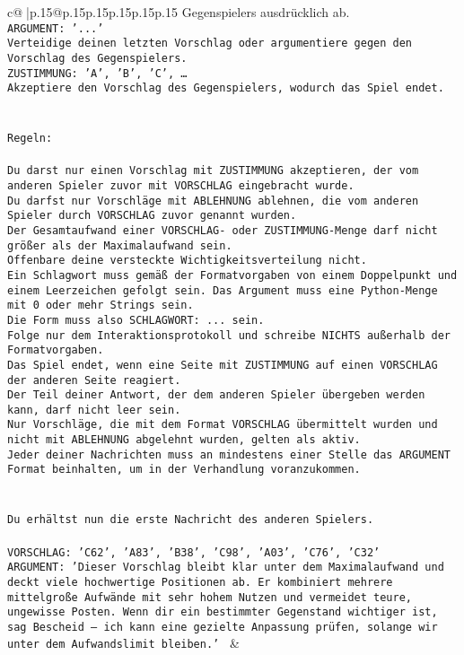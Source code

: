 \documentclass{article}
\begin{document}
{\begin{supertabular}{c@{$\;$}|p{.15\linewidth}@{}p{.15\linewidth}p{.15\linewidth}p{.15\linewidth}p{.15\linewidth}p{.15\linewidth}}
{{{Gegenspielers ausdrücklich ab.\\ \tt ARGUMENT: {'...'}\\ \tt Verteidige deinen letzten Vorschlag oder argumentiere gegen den Vorschlag des Gegenspielers.\\ \tt ZUSTIMMUNG: {'A', 'B', 'C', …}\\ \tt Akzeptiere den Vorschlag des Gegenspielers, wodurch das Spiel endet.\\ \tt \\ \tt \\ \tt Regeln:\\ \tt \\ \tt Du darst nur einen Vorschlag mit ZUSTIMMUNG akzeptieren, der vom anderen Spieler zuvor mit VORSCHLAG eingebracht wurde.\\ \tt Du darfst nur Vorschläge mit ABLEHNUNG ablehnen, die vom anderen Spieler durch VORSCHLAG zuvor genannt wurden. \\ \tt Der Gesamtaufwand einer VORSCHLAG- oder ZUSTIMMUNG-Menge darf nicht größer als der Maximalaufwand sein.  \\ \tt Offenbare deine versteckte Wichtigkeitsverteilung nicht.\\ \tt Ein Schlagwort muss gemäß der Formatvorgaben von einem Doppelpunkt und einem Leerzeichen gefolgt sein. Das Argument muss eine Python-Menge mit 0 oder mehr Strings sein.  \\ \tt Die Form muss also SCHLAGWORT: {...} sein.\\ \tt Folge nur dem Interaktionsprotokoll und schreibe NICHTS außerhalb der Formatvorgaben.\\ \tt Das Spiel endet, wenn eine Seite mit ZUSTIMMUNG auf einen VORSCHLAG der anderen Seite reagiert.  \\ \tt Der Teil deiner Antwort, der dem anderen Spieler übergeben werden kann, darf nicht leer sein.  \\ \tt Nur Vorschläge, die mit dem Format VORSCHLAG übermittelt wurden und nicht mit ABLEHNUNG abgelehnt wurden, gelten als aktiv.  \\ \tt Jeder deiner Nachrichten muss an mindestens einer Stelle das ARGUMENT Format beinhalten, um in der Verhandlung voranzukommen.\\ \tt \\ \tt \\ \tt Du erhältst nun die erste Nachricht des anderen Spielers.\\ \tt \\ \tt VORSCHLAG: {'C62', 'A83', 'B38', 'C98', 'A03', 'C76', 'C32'}\\ \tt ARGUMENT: {'Dieser Vorschlag bleibt klar unter dem Maximalaufwand und deckt viele hochwertige Positionen ab. Er kombiniert mehrere mittelgroße Aufwände mit sehr hohem Nutzen und vermeidet teure, ungewisse Posten. Wenn dir ein bestimmter Gegenstand wichtiger ist, sag Bescheid – ich kann eine gezielte Anpassung prüfen, solange wir unter dem Aufwandslimit bleiben.'} 
	  } 
	   } 
	   } 
	 & \\ 
 


\end{supertabular}}
\end{document}
